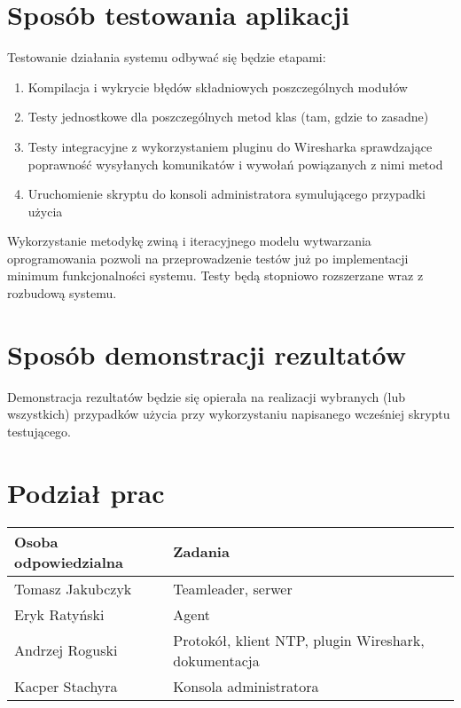 \documentclass[10pt,a4paper]{article}
\begin{document}
	\section{Sposób testowania aplikacji}
		Testowanie działania systemu odbywać się będzie etapami: \\
		\begin{enumerate}
		    \item Kompilacja i wykrycie błędów składniowych poszczególnych modułów
		    \item Testy jednostkowe dla poszczególnych metod klas (tam, gdzie to zasadne)
		    \item Testy integracyjne z wykorzystaniem pluginu do Wiresharka sprawdzające poprawność wysyłanych komunikatów i wywołań powiązanych z nimi metod
		    \item Uruchomienie skryptu do konsoli administratora symulującego przypadki użycia
	    \end{enumerate}
	    
	    Wykorzystanie metodykę zwiną i iteracyjnego modelu wytwarzania oprogramowania pozwoli na przeprowadzenie testów już po implementacji minimum funkcjonalności systemu. Testy będą stopniowo rozszerzane wraz z rozbudową systemu.

	\section{Sposób  demonstracji rezultatów}
		Demonstracja rezultatów będzie się opierała na realizacji wybranych (lub wszystkich) przypadków użycia przy wykorzystaniu napisanego wcześniej skryptu testującego.

	\section{Podział prac}
	
	    \begin{tabular}{ l | l }
		    \textbf{Osoba odpowiedzialna} & \textbf{Zadania} \\
		    \hline
		    Tomasz Jakubczyk  & Teamleader, serwer  \\
		    Eryk Ratyński  & Agent  \\
		    Andrzej Roguski  & Protokół, klient NTP, plugin Wireshark, dokumentacja \\
		    Kacper Stachyra & Konsola administratora \\
		\end{tabular}  
		
\end{document}
